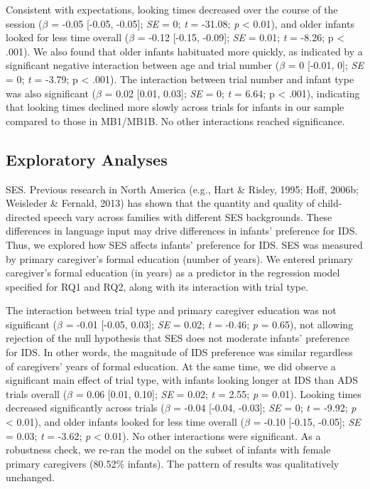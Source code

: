 \documentclass[
  ,man,floatsintext]{apa6}
\begin{document}
Consistent with expectations, looking times decreased over the course of the session (\emph{\(\beta\)} = -0.05 {[}-0.05, -0.05{]}; \emph{SE} = 0; \emph{t} = -31.08; \emph{p} \textless{} 0.01), and older infants looked for less time overall (\emph{\(\beta\)} = -0.12 {[}-0.15, -0.09{]}; \emph{SE} = 0.01; \emph{t} = -8.26; p \textless{} .001). We also found that older infants habituated more quickly, as indicated by a significant negative interaction between age and trial number (\emph{\(\beta\)} = 0 {[}-0.01, 0{]}; \emph{SE} = 0; \emph{t} = -3.79; p \textless{} .001). The interaction between trial number and infant type was also significant (\emph{\(\beta\)} = 0.02 {[}0.01, 0.03{]}; \emph{SE} = 0; \emph{t} = 6.64; p \textless{} .001), indicating that looking times declined more slowly across trials for infants in our sample compared to those in MB1/MB1B. No other interactions reached significance.

\hypertarget{exploratory-analyses}{%
\subsection{Exploratory Analyses}\label{exploratory-analyses}}

SES. Previous research in North America (e.g., Hart \& Risley, 1995; Hoff, 2006b; Weisleder \& Fernald, 2013) has shown that the quantity and quality of child-directed speech vary across families with different SES backgrounds. These differences in language input may drive differences in infants' preference for IDS. Thus, we explored how SES affects infants' preference for IDS. SES was measured by primary caregiver's formal education (number of years). We entered primary caregiver's formal education (in years) as a predictor in the regression model specified for RQ1 and RQ2, along with its interaction with trial type.

The interaction between trial type and primary caregiver education was not significant (\emph{\(\beta\)} = -0.01 {[}-0.05, 0.03{]}; \emph{SE} = 0.02; \emph{t} = -0.46; \emph{p} = 0.65), not allowing rejection of the null hypothesis that SES does not moderate infants' preference for IDS. In other words, the magnitude of IDS preference was similar regardless of caregivers' years of formal education. At the same time, we did observe a significant main effect of trial type, with infants looking longer at IDS than ADS trials overall (\emph{\(\beta\)} = 0.06 {[}0.01, 0.10{]}; \emph{SE} = 0.02; \emph{t} = 2.55; \emph{p} = 0.01). Looking times decreased significantly across trials (\emph{\(\beta\)} = -0.04 {[}-0.04, -0.03{]}; \emph{SE} = 0; \emph{t} = -9.92; \emph{p} \textless{} 0.01), and older infants looked for less time overall (\emph{\(\beta\)} = -0.10 {[}-0.15, -0.05{]}; \emph{SE} = 0.03; \emph{t} = -3.62; \emph{p} \textless{} 0.01). No other interactions were significant. As a robustness check, we re-ran the model on the subset of infants with female primary caregivers (80.52\% infants). The pattern of results was qualitatively unchanged.
\end{document}
